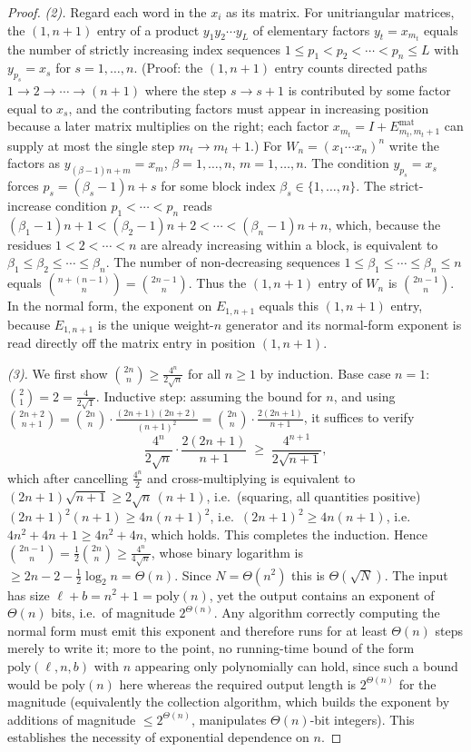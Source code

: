 \documentclass{amsart}
\theoremstyle{definition}
\begin{document}
\begin{proof}
\emph{(2).} Regard each word in the $x_i$ as its matrix. For unitriangular matrices, the
$(1,n+1)$ entry of a product $y_1y_2\cdots y_L$ of elementary factors $y_t=x_{m_t}$ equals the
number of strictly increasing index sequences $1\le p_1<p_2<\cdots<p_n\le L$ with
$y_{p_s}=x_s$ for $s=1,\dots,n$. (Proof: the $(1,n+1)$ entry counts directed paths
$1\to2\to\cdots\to(n+1)$ where the step $s\to s+1$ is contributed by some factor equal to
$x_s$, and the contributing factors must appear in increasing position because a later
matrix multiplies on the right; each factor $x_{m_t}=I+E_{m_t,m_t+1}^{\mathrm{mat}}$ can supply
at most the single step $m_t\to m_t+1$.) For $W_n=(x_1\cdots x_n)^n$ write the factors as
$y_{(\beta-1)n+m}=x_m$, $\beta=1,\dots,n$, $m=1,\dots,n$. The condition $y_{p_s}=x_s$ forces
$p_s=(\beta_s-1)n+s$ for some block index $\beta_s\in\{1,\dots,n\}$. The strict-increase
condition $p_1<\cdots<p_n$ reads $(\beta_1-1)n+1<(\beta_2-1)n+2<\cdots<(\beta_n-1)n+n$, which,
because the residues $1<2<\cdots<n$ are already increasing within a block, is equivalent to
$\beta_1\le\beta_2\le\cdots\le\beta_n$. The number of non-decreasing sequences $1\le
\beta_1\le\cdots\le\beta_n\le n$ equals $\binom{n+(n-1)}{n}=\binom{2n-1}{n}$. Thus the
$(1,n+1)$ entry of $W_n$ is $\binom{2n-1}{n}$. In the normal form, the exponent on $E_{1,n+1}$
equals this $(1,n+1)$ entry, because $E_{1,n+1}$ is the unique weight-$n$ generator and its
normal-form exponent is read directly off the matrix entry in position $(1,n+1)$.

\emph{(3).} We first show $\binom{2n}{n}\ge\frac{4^n}{2\sqrt n}$ for all $n\ge1$ by
induction. Base case $n=1$: $\binom{2}{1}=2=\frac{4}{2\sqrt1}$. Inductive step: assuming the
bound for $n$, and using $\binom{2n+2}{n+1}=\binom{2n}{n}\cdot\frac{(2n+1)(2n+2)}{(n+1)^2}
=\binom{2n}{n}\cdot\frac{2(2n+1)}{n+1}$, it suffices to verify
\[
\frac{4^n}{2\sqrt n}\cdot\frac{2(2n+1)}{n+1}\;\ge\;\frac{4^{n+1}}{2\sqrt{n+1}},
\]
which after cancelling $\frac{4^n}{2}$ and cross-multiplying is equivalent to
$(2n+1)\sqrt{n+1}\ge 2\sqrt n\,(n+1)$, i.e.\ (squaring, all quantities positive)
$(2n+1)^2(n+1)\ge 4n(n+1)^2$, i.e.\ $(2n+1)^2\ge 4n(n+1)$, i.e.\ $4n^2+4n+1\ge 4n^2+4n$, which
holds. This completes the induction. Hence
$\binom{2n-1}{n}=\tfrac12\binom{2n}{n}\ge\frac{4^n}{4\sqrt n}$, whose binary logarithm is
$\ge 2n-2-\tfrac12\log_2 n=\Theta(n)$. Since $N=\Theta(n^2)$ this is $\Theta(\sqrt N)$. The
input has size $\ell+b=n^2+1=\mathrm{poly}(n)$, yet the output contains an exponent of
$\Theta(n)$ bits, i.e.\ of magnitude $2^{\Theta(n)}$. Any algorithm correctly computing the
normal form must emit this exponent and therefore runs for at least $\Theta(n)$ steps merely to
write it; more to the point, no running-time bound of the form $\mathrm{poly}(\ell,n,b)$ with
$n$ appearing only polynomially can hold, since such a bound would be $\mathrm{poly}(n)$ here
whereas the required output length is $2^{\Theta(n)}$ for the magnitude (equivalently the
collection algorithm, which builds the exponent by additions of magnitude $\le 2^{\Theta(n)}$,
manipulates $\Theta(n)$-bit integers). This establishes the necessity of exponential dependence
on $n$.
\end{proof}
\end{document}
